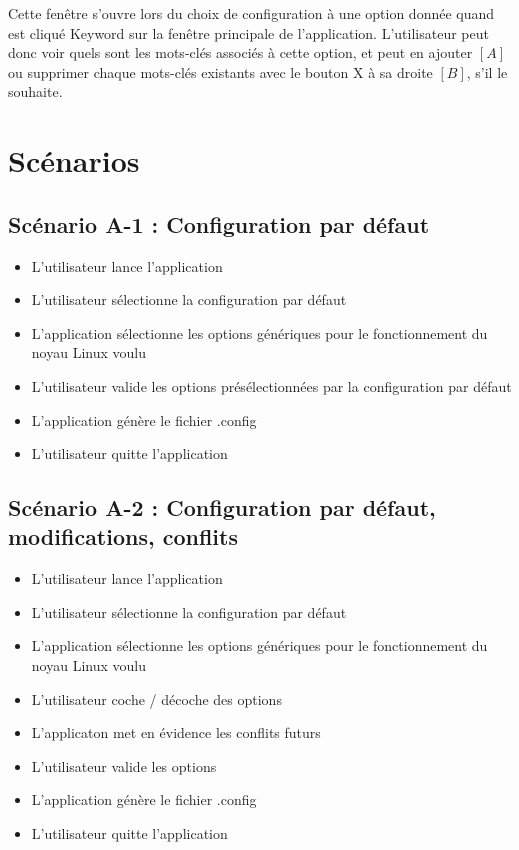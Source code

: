 \documentclass[16pts]{report}
\begin{document}
Cette fenêtre s'ouvre lors du choix de configuration à une option donnée quand
est cliqué Keyword sur la fenêtre principale de l'application.
L'utilisateur peut donc voir quels sont les mots-clés associés à cette option,
et peut en ajouter $[A]$ ou supprimer chaque mots-clés existants avec le bouton
X à sa droite $[B]$, s'il le souhaite.


\chapter{Scénarios}
\label{cha:Scénarios}

\section{Scénario A-1 : Configuration par défaut}
\label{sec:Scénario A-1 : Configuration par défaut}

\begin{itemize}
    \item L'utilisateur lance l'application
    \item L'utilisateur sélectionne la configuration par défaut
    \item L'application sélectionne les options génériques pour le
        fonctionnement du noyau Linux voulu
    \item L'utilisateur valide les options présélectionnées par la
        configuration par défaut
    \item L'application génère le fichier .config
    \item L'utilisateur quitte l'application
\end{itemize}


\section{Scénario A-2 : Configuration par défaut, modifications, conflits}
\label{sec:Scénario A-2 : Configuration par défaut, modifications, conflits}

\begin{itemize}
    \item L'utilisateur lance l'application
    \item L'utilisateur sélectionne la configuration par défaut
    \item L'application sélectionne les options génériques pour le
        fonctionnement du noyau Linux voulu
    \item L'utilisateur coche / décoche des options
    \item L'applicaton met en évidence les conflits futurs
    \item L'utilisateur valide les options
    \item L'application génère le fichier .config
    \item L'utilisateur quitte l'application
\end{itemize}
\end{document}
